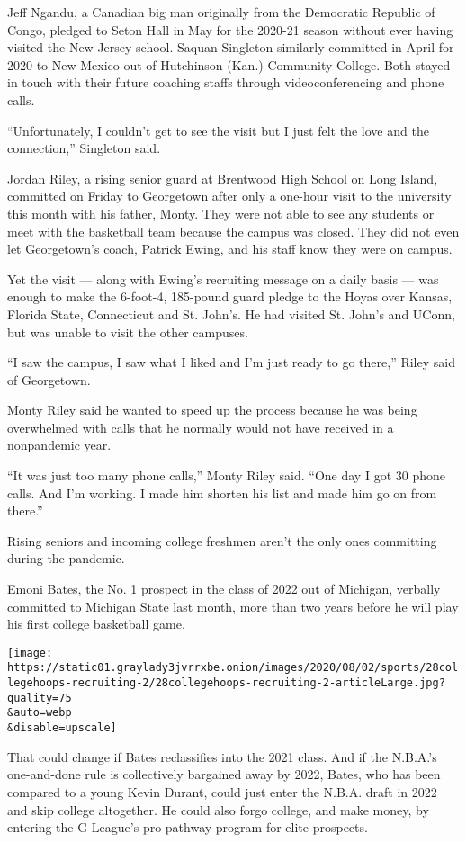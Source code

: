 Jeff Ngandu, a Canadian big man originally from the Democratic Republic
of Congo, pledged to Seton Hall in May for the 2020-21 season without
ever having visited the New Jersey school. Saquan Singleton similarly
committed in April for 2020 to New Mexico out of Hutchinson (Kan.)
Community College. Both stayed in touch with their future coaching
staffs through videoconferencing and phone calls.

``Unfortunately, I couldn't get to see the visit but I just felt the
love and the connection,'' Singleton said.

Jordan Riley, a rising senior guard at Brentwood High School on Long
Island, committed on Friday to Georgetown after only a one-hour visit to
the university this month with his father, Monty. They were not able to
see any students or meet with the basketball team because the campus was
closed. They did not even let Georgetown's coach, Patrick Ewing, and his
staff know they were on campus.

Yet the visit --- along with Ewing's recruiting message on a daily basis
--- was enough to make the 6-foot-4, 185-pound guard pledge to the Hoyas
over Kansas, Florida State, Connecticut and St. John's. He had visited
St. John's and UConn, but was unable to visit the other campuses.

``I saw the campus, I saw what I liked and I'm just ready to go there,''
Riley said of Georgetown.

Monty Riley said he wanted to speed up the process because he was being
overwhelmed with calls that he normally would not have received in a
nonpandemic year.

``It was just too many phone calls,'' Monty Riley said. ``One day I got
30 phone calls. And I'm working. I made him shorten his list and made
him go on from there.''

Rising seniors and incoming college freshmen aren't the only ones
committing during the pandemic.

Emoni Bates, the No. 1 prospect in the class of 2022 out of Michigan,
verbally committed to Michigan State last month, more than two years
before he will play his first college basketball game.

\texttt{[image: https://static01.graylady3jvrrxbe.onion/images/2020/08/02/sports/28collegehoops-recruiting-2/28collegehoops-recruiting-2-articleLarge.jpg?quality=75\\\&auto=webp\\\&disable=upscale]}

That could change if Bates reclassifies into the 2021 class. And if the
N.B.A.'s one-and-done rule is collectively bargained away by 2022,
Bates, who has been compared to a young Kevin Durant, could just enter
the N.B.A. draft in 2022 and skip college altogether. He could also
forgo college, and make money, by entering the G-League's pro pathway
program for elite prospects.

